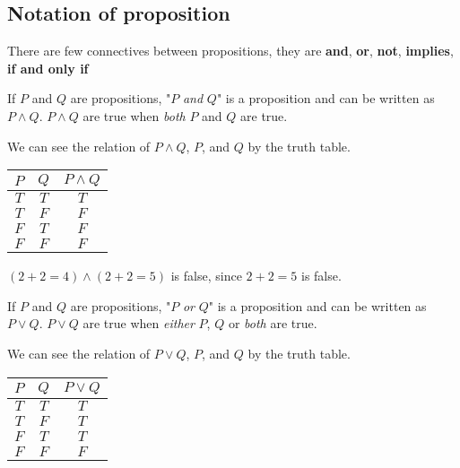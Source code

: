 \documentclass[a4paper]{article}
\begin{document}
\subsection{Notation of proposition}
There are few connectives between propositions, they are \textbf{and}, \textbf{or}, \textbf{not}, \textbf{implies}, \textbf{if and only if}

\begin{defi}[And]
If $P$ and $Q$ are propositions, "$P$ \emph{and} $Q$" is a proposition and can be written as $P \land Q$. $P \land Q$ are true when \emph{both} $P$ and $Q$ are true.
\end{defi}

We can see the relation of $P \land Q$, $P$, and $Q$ by the truth table.

\begin{center}
	\begin{tabular}{|c|c|c|}
		\hline
		$P$ & $Q$ & $P \land Q$\\
		\hline
		$T$ & $T$ & $T$\\
		\hline
		$T$ & $F$ & $F$\\
		\hline
		$F$ & $T$ & $F$\\
		\hline
		$F$ & $F$ & $F$\\
		\hline
	\end{tabular}
\end{center}

\begin{eg}
$(2 + 2 = 4) \land (2 + 2 = 5)$ is false, since $2 + 2 = 5$ is false.
\end{eg}

\begin{defi}[Or]
If $P$ and $Q$ are propositions, "$P$ \emph{or} $Q$" is a proposition and can be written as $P \lor Q$. $P \lor Q$ are true when \emph{either} $P$, $Q$ or \emph{both} are true.
\end{defi}

We can see the relation of $P \lor Q$, $P$, and $Q$ by the truth table.

\begin{center}
	\begin{tabular}{|c|c|c|}
		\hline
		$P$ & $Q$ & $P \lor Q$\\
		\hline
		$T$ & $T$ & $T$\\
		\hline
		$T$ & $F$ & $T$\\
		\hline
		$F$ & $T$ & $T$\\
		\hline
		$F$ & $F$ & $F$\\
		\hline
	\end{tabular}
\end{center}
\end{document}
